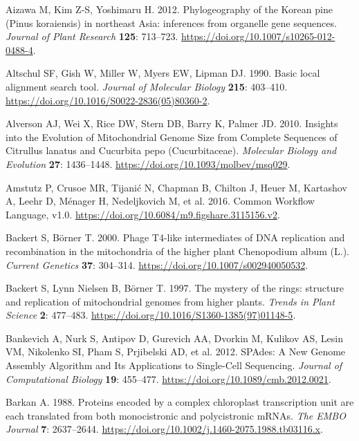 \documentclass[
  12pt,
  oneside,
  openany]{book}
\begin{document}
\leavevmode\hypertarget{ref-Aizawa_2012}{}%
Aizawa M, Kim Z-S, Yoshimaru H. 2012. Phylogeography of the Korean pine (Pinus koraiensis) in northeast Asia: inferences from organelle gene sequences. \emph{Journal of Plant Research} \textbf{125}: 713--723. \url{https://doi.org/10.1007/s10265-012-0488-4}.

\leavevmode\hypertarget{ref-Altschul_1990}{}%
Altschul SF, Gish W, Miller W, Myers EW, Lipman DJ. 1990. Basic local alignment search tool. \emph{Journal of Molecular Biology} \textbf{215}: 403--410. \url{https://doi.org/10.1016/S0022-2836(05)80360-2}.

\leavevmode\hypertarget{ref-Alverson_2010}{}%
Alverson AJ, Wei X, Rice DW, Stern DB, Barry K, Palmer JD. 2010. Insights into the Evolution of Mitochondrial Genome Size from Complete Sequences of Citrullus lanatus and Cucurbita pepo (Cucurbitaceae). \emph{Molecular Biology and Evolution} \textbf{27}: 1436--1448. \url{https://doi.org/10.1093/molbev/msq029}.

\leavevmode\hypertarget{ref-Amstutz_2016}{}%
Amstutz P, Crusoe MR, Tijanić N, Chapman B, Chilton J, Heuer M, Kartashov A, Leehr D, Ménager H, Nedeljkovich M, et al. 2016. Common Workflow Language, v1.0. \url{https://doi.org/10.6084/m9.figshare.3115156.v2}.

\leavevmode\hypertarget{ref-Backert_2000}{}%
Backert S, Börner T. 2000. Phage T4-like intermediates of DNA replication and recombination in the mitochondria of the higher plant Chenopodium album (L.). \emph{Current Genetics} \textbf{37}: 304--314. \url{https://doi.org/10.1007/s002940050532}.

\leavevmode\hypertarget{ref-Backert_1997}{}%
Backert S, Lynn Nielsen B, Börner T. 1997. The mystery of the rings: structure and replication of mitochondrial genomes from higher plants. \emph{Trends in Plant Science} \textbf{2}: 477--483. \url{https://doi.org/10.1016/S1360-1385(97)01148-5}.

\leavevmode\hypertarget{ref-Bankevich_2012}{}%
Bankevich A, Nurk S, Antipov D, Gurevich AA, Dvorkin M, Kulikov AS, Lesin VM, Nikolenko SI, Pham S, Prjibelski AD, et al. 2012. SPAdes: A New Genome Assembly Algorithm and Its Applications to Single-Cell Sequencing. \emph{Journal of Computational Biology} \textbf{19}: 455--477. \url{https://doi.org/10.1089/cmb.2012.0021}.

\leavevmode\hypertarget{ref-Barkan_1988}{}%
Barkan A. 1988. Proteins encoded by a complex chloroplast transcription unit are each translated from both monocistronic and polycistronic mRNAs. \emph{The EMBO Journal} \textbf{7}: 2637--2644. \url{https://doi.org/10.1002/j.1460-2075.1988.tb03116.x}.
\end{document}
